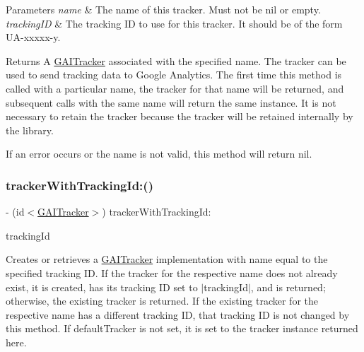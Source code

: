 \begin{DoxyParams}{Parameters}
{\em name} & The name of this tracker. Must not be {\ttfamily nil} or empty.\\
\hline
{\em tracking\+ID} & The tracking ID to use for this tracker. It should be of the form {\ttfamily U\+A-\/xxxxx-\/y}.\\
\hline
\end{DoxyParams}
\begin{DoxyReturn}{Returns}
A \hyperlink{protocol_g_a_i_tracker-p}{G\+A\+I\+Tracker} associated with the specified name. The tracker can be used to send tracking data to Google Analytics. The first time this method is called with a particular name, the tracker for that name will be returned, and subsequent calls with the same name will return the same instance. It is not necessary to retain the tracker because the tracker will be retained internally by the library.
\end{DoxyReturn}
If an error occurs or the name is not valid, this method will return {\ttfamily nil}. \mbox{\label{interface_g_a_i_a618ed07fef9f41c6cd33d17debec402c}} 
\subsubsection{\texorpdfstring{tracker\+With\+Tracking\+Id\+:()}{trackerWithTrackingId:()}}
{\footnotesize\ttfamily -\/ (id$<$\hyperlink{protocol_g_a_i_tracker-p}{G\+A\+I\+Tracker}$>$) tracker\+With\+Tracking\+Id\+: \begin{DoxyParamCaption}\item[{(N\+S\+String $\ast$)}]{tracking\+Id }\end{DoxyParamCaption}}

Creates or retrieves a \hyperlink{protocol_g_a_i_tracker-p}{G\+A\+I\+Tracker} implementation with name equal to the specified tracking ID. If the tracker for the respective name does not already exist, it is created, has it\textquotesingle{}s tracking ID set to $\vert$tracking\+Id$\vert$, and is returned; otherwise, the existing tracker is returned. If the existing tracker for the respective name has a different tracking ID, that tracking ID is not changed by this method. If default\+Tracker is not set, it is set to the tracker instance returned here.


